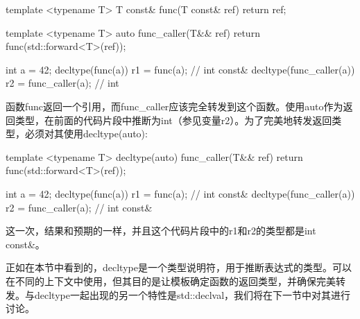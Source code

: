 \begin{cppcode}
template <typename T>
T const& func(T const& ref)
{
	return ref;
}

template <typename T>
auto func_caller(T&& ref)
{
return func(std::forward<T>(ref));
}

int a = 42;
decltype(func(a)) r1 = func(a); // int const&
decltype(func_caller(a)) r2 = func_caller(a); // int
\end{cppcode}

函数func返回一个引用，而func_caller应该完全转发到这个函数。使用auto作为返回类型，在前面的代码片段中推断为int（参见变量r2）。为了完美地转发返回类型，必须对其使用decltype(auto):

\begin{cppcode}
template <typename T>
decltype(auto) func_caller(T&& ref)
{
	return func(std::forward<T>(ref));
}

int a = 42;
decltype(func(a)) r1 = func(a); // int const&
decltype(func_caller(a)) r2 = func_caller(a); // int const&
\end{cppcode}

这一次，结果和预期的一样，并且这个代码片段中的r1和r2的类型都是int const\&。

正如在本节中看到的，decltype是一个类型说明符，用于推断表达式的类型。可以在不同的上下文中使用，但其目的是让模板确定函数的返回类型，并确保完美转发。与decltype一起出现的另一个特性是std::declval，我们将在下一节中对其进行讨论。










